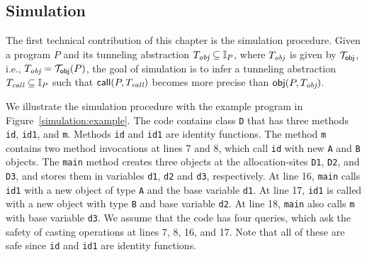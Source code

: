 

\subsection{Simulation}\label{sec:simulation}


The first technical contribution of this chapter is the simulation procedure. 
Given a program $P$ and its tunneling abstraction $T_{\text{\it obj}} \subseteq \mathbb{I}_P$, where $T_{\text{\it obj}}$ is given by $\mathcal{T}_{{\sf obj}}$, i.e., 
$T_{\text{\it obj}} = \mathcal{T}_{{\sf obj}}(P)$,
the goal of simulation is to infer a tunneling abstraction
$T_{\text{\it call}} \subseteq \mathbb{I}_P$ such that ${\sf call}(P, T_{\text{\it call}})$ becomes more
precise than ${\sf obj} (P, T_{\text{\it obj}})$.




\label{sec:simulation-overview}
We illustrate the simulation procedure with the
example program in Figure~\ref{simulation:example}.  The code
contains class {\tt D} that has three methods \texttt{id},
\texttt{id1}, and \texttt{m}.  Methods \texttt{id} and \texttt{id1}
are identity functions.
The method \texttt{m} contains two method invocations at lines 7 and
8, which call \texttt{id} with new \texttt{A} and \texttt{B} objects.
The \texttt{main} method creates three objects at the
allocation-sites \texttt{D1}, \texttt{D2}, and \texttt{D3}, and stores
them in variables \texttt{d1}, \texttt{d2} and \texttt{d3},
respectively.  At line 16, \texttt{main} calls \texttt{id1} with
a new object of type {\tt A} and the base variable \texttt{d1}.  At line 17,
\texttt{id1} is called with a new object with type {\tt B} and base variable
\texttt{d2}.  At line 18, \texttt{main} also calls {\tt m} with base
variable \texttt{d3}.  We assume that the code has four queries, which ask the
safety of casting operations at lines 7, 8, 16, and 17. Note that all
of these are safe since {\tt id} and {\tt id1} are identity
functions.








